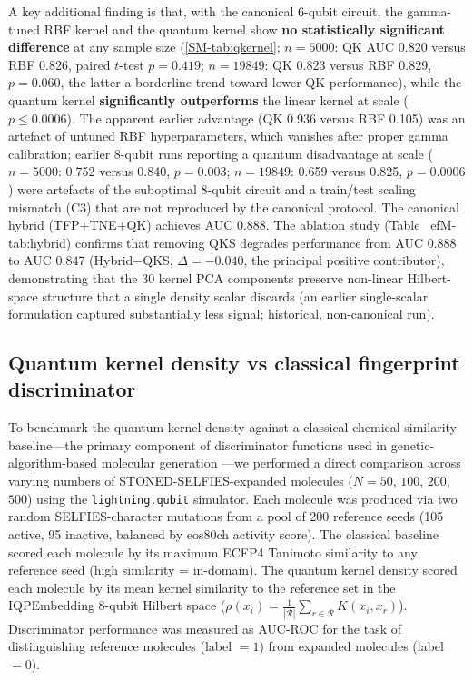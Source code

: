 \documentclass[11pt,a4paper]{article}
\begin{document}
A key additional finding is that, with the canonical 6-qubit circuit, the gamma-tuned RBF kernel and the quantum kernel show \textbf{no statistically significant difference} at any sample size (\cref{SM-tab:qkernel}; $n = \num{5000}$: QK AUC \num{0.820} versus RBF \num{0.826}, paired $t$-test $p = \num{0.419}$; $n = \num{19849}$: QK \num{0.823} versus RBF \num{0.829}, $p = \num{0.060}$, the latter a borderline trend toward lower QK performance), while the quantum kernel \textbf{significantly outperforms} the linear kernel at scale ($p \leq \num{0.0006}$). The apparent earlier advantage (QK \num{0.936} versus RBF \num{0.105}) was an artefact of untuned RBF hyperparameters, which vanishes after proper gamma calibration; earlier 8-qubit runs reporting a quantum disadvantage at scale ($n = \num{5000}$: \num{0.752} versus \num{0.840}, $p = \num{0.003}$; $n = \num{19849}$: \num{0.659} versus \num{0.825}, $p = \num{0.0006}$) were artefacts of the suboptimal 8-qubit circuit and a train/test scaling mismatch (C3) that are not reproduced by the canonical protocol. The canonical hybrid (TFP+TNE+QK) achieves AUC \num{0.888}. The ablation study (Table~
ef{M-tab:hybrid}) confirms that removing QKS degrades performance from AUC \num{0.888} to AUC \num{0.847} (Hybrid$-$QKS, $\Delta = -\num{0.040}$, the principal positive contributor), demonstrating that the 30 kernel PCA components preserve non-linear Hilbert-space structure that a single density scalar discards (an earlier single-scalar formulation captured substantially less signal; historical, non-canonical run).



\subsection{Quantum kernel density vs classical fingerprint discriminator}


To benchmark the quantum kernel density against a classical chemical similarity baseline---the primary component of discriminator functions used in genetic-algorithm-based molecular generation \citep{jensen2019augmenting}---we performed a direct comparison across varying numbers of STONED-SELFIES-expanded molecules ($N = 50$, $100$, $200$, $500$) using the \texttt{lightning.qubit} simulator. Each molecule was produced via two random SELFIES-character mutations from a pool of \num{200} reference seeds (\num{105} active, \num{95} inactive, balanced by eos80ch activity score). The classical baseline scored each molecule by its maximum ECFP4 Tanimoto similarity to any reference seed (high similarity = in-domain). The quantum kernel density scored each molecule by its mean kernel similarity to the reference set in the IQPEmbedding 8-qubit Hilbert space ($\rho(x_i) = \frac{1}{|\mathcal{R}|}\sum_{r \in \mathcal{R}} K(x_i, x_r)$). Discriminator performance was measured as AUC-ROC for the task of distinguishing reference molecules (label $= 1$) from expanded molecules (label $= 0$).
\end{document}
